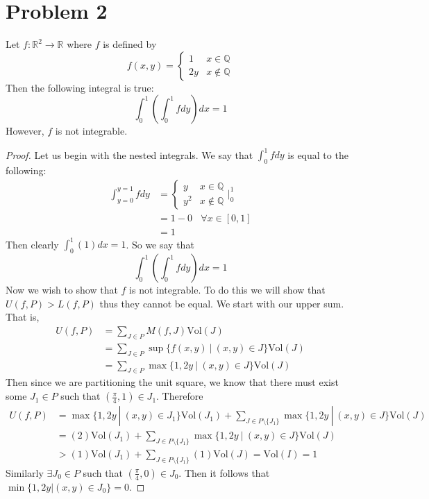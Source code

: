 \documentclass{article}
\theoremstyle{definition}
\begin{document}
\section*{Problem 2}
\begin{mdframed}[]
    Let $f:\mathbb{R}^2 \rightarrow \mathbb{R}$ where $f$ is defined by
\[
    f(x,y) = \begin{cases}
        1 & x \in \mathbb{Q}\\
        2y & x \notin \mathbb{Q}
    \end{cases}
\]
Then the following integral is true:
\[
    \int_0^1\left(\int_0^1fdy\right)dx = 1
\]
However, $f$ is not integrable.
\end{mdframed}
\begin{proof}
    Let us begin with the nested integrals.
    We say that $\int_0^1fdy$ is equal to the following:
    \begin{align*}
        \int_{y=0}^{y=1}fdy &= \begin{cases}
            y & x \in \mathbb{Q} \\
            y^2 & x \notin \mathbb{Q}
        \end{cases}\bigg|_0^1\\
        &= 1 - 0 \ \ \ \ \forall x \in [0,1] \\
        &= 1
    \end{align*}
    Then clearly $\int_0^1 (1)dx = 1$. So we say that 
    \[
        \int_0^1\left(\int_0^1 fdy\right)dx = 1
    \]
    Now we wish to show that $f$ is not integrable.
    To do this we will show that $U(f,P) > L(f,P)$ thus they cannot be equal.
    We start with our upper sum. That is,
    \begin{align*}
        U(f,P) &= \sum_{J \in P} M(f,J) \text{Vol}(J) \\
        &= \sum_{J \in P}\sup\{f(x,y) \ | \ (x,y) \in J\}  \text{Vol}(J) \\
        &= \sum_{J \in P}\max\{1,2y \ | \ (x,y) \in J\}  \text{Vol}(J)
    \end{align*}
    Then since we are partitioning the unit square, we know that there must exist some 
    $J_1 \in P$ such that $(\frac{\pi}{4},1) \in J_1$. Therefore 
    \begin{align*}
        U(f,P) &= \max\{1,2y \ | \ (x,y) \in J_1\}\text{Vol}(J_1) + \sum_{J \in P \setminus \{J_1\}} \max\{1,2y \ | \ (x,y) \in J\}  \text{Vol}(J)\\
        &= (2) \text{Vol}(J_1) + \sum_{J \in P \setminus \{J_1\}} \max\{1,2y \ | \ (x,y) \in J\}  \text{Vol}(J)\\
        &>  (1) \text{Vol}(J_1) + \sum_{J \in P \setminus \{J_1\}} (1) \text{Vol}(J) = \text{Vol}(I) = 1
    \end{align*}
    Similarly $\exists J_0 \in P$ such that $(\frac{\pi}{4}, 0) \in J_0$. Then it follows that $\min\{1,2y | (x,y) \in J_0\} = 0$.
\end{proof}
\end{document}
